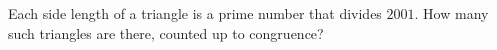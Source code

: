 Each side length of a triangle is a prime number that divides $2001$. How many such triangles are there, counted up to congruence?
